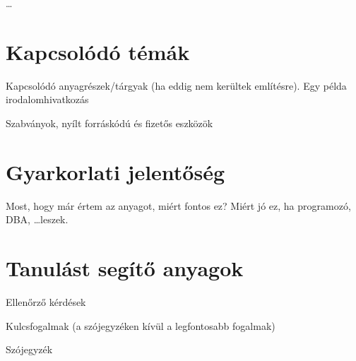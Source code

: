 \ldots

\section{Kapcsolódó témák}

Kapcsolódó anyagrészek/tárgyak (ha eddig nem kerültek említésre). Egy példa irodalomhivatkozás~\cite{DBLP:books/cs/Ullman88}

Szabványok, nyílt forráskódú és fizetős eszközök

\section{Gyarkorlati jelentőség}

Most, hogy már értem az anyagot, miért fontos ez? Miért jó ez, ha programozó, DBA, \ldots leszek.

\section{Tanulást segítő anyagok}

Ellenőrző kérdések

Kulcsfogalmak (a szójegyzéken kívül a legfontosabb fogalmak)

Szójegyzék